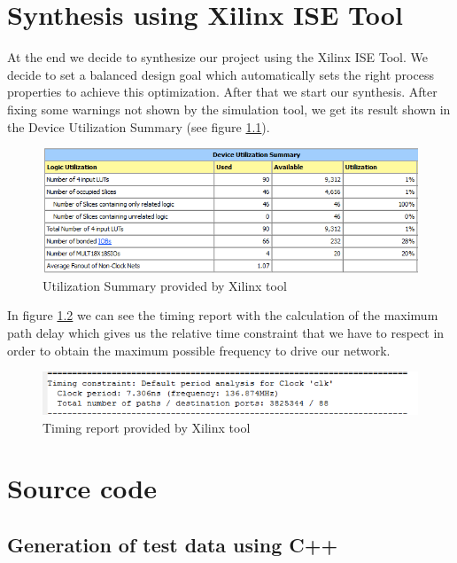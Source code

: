 \documentclass[12pt,a4paper]{report}
\begin{document}
\chapter{Synthesis using Xilinx ISE Tool}
At the end we decide to synthesize our project using the Xilinx ISE Tool. We decide to set a balanced design goal which automatically sets the right process properties to achieve this optimization. After that we start our synthesis.
After fixing some warnings not shown by the simulation tool, we get its result shown in the Device Utilization Summary (see figure \ref{fig:dev_utilization_summ}). 

\begin{figure}[!h]
	\centering
	\includegraphics[scale=0.9]{img/utilizationSummary.png}
	\caption{Utilization Summary provided by Xilinx tool\label{fig:dev_utilization_summ}}
\end{figure}


In figure \ref{fig:timing_report} we can see the timing report with the calculation of the maximum path delay which gives us the relative time constraint that we have to respect in order to obtain the maximum possible frequency to drive our network.

\begin{figure}[!h]
	\centering
	\includegraphics[scale=0.9]{img/timingReport.png}
	\caption{Timing report provided by Xilinx tool\label{fig:timing_report}}
\end{figure}


\appendix

\chapter{Source code}

\section{Generation of test data using C++}
\label{sec:test_generator}
\end{document}
